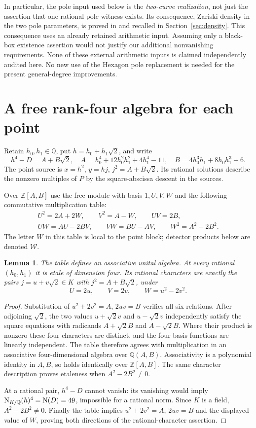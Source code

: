 \documentclass[11pt,a4paper]{article}
\newtheorem{lemma}[theorem]{Lemma}
\theoremstyle{remark}\newtheorem{remark}[theorem]{Remark}
\newcommand{\Q}{\mathbb Q}\newcommand{\Z}{\mathbb Z}\newcommand{\C}{\mathbb C}
\begin{document}
In particular, the pole input used below is the \emph{two-curve
realization}, not just the assertion that one rational pole witness
exists. Its consequence, Zariski density in the two pole parameters,
is proved in \cite{Density} and recalled in Section~\ref{sec:density}.
This consequence uses an already retained arithmetic input. Assuming
only a black-box existence assertion would not justify our additional
nonvanishing requirements. None of these external arithmetic inputs is
claimed independently audited here. No new use of the Hexagon pole
replacement is needed for the present general-degree improvements.

\section{A free rank-four algebra for each point}\label{sec:points}
Retain $h_0,h_1\in\Q$, put $h=h_0+h_1\sqrt2$, and write
\[
 h^4-D=A+B\sqrt2,
\quad A=h_0^4+12h_0^2h_1^2+4h_1^4-11,
\quad B=4h_0^3h_1+8h_0h_1^3+6.
\]
The point source is $x=h^2$, $y=hj$, $j^2=A+B\sqrt2$.
Its rational solutions describe the nonzero multiples of $P$ by the
square-abscissa descent in the sources.

Over $\Z[A,B]$ use the free module with basis $1,U,V,W$ and the
following commutative multiplication table:
\begin{equation}\label{eq:table}
\begin{gathered}
 U^2=2A+2W,\qquad V^2=A-W,\qquad UV=2B,\\
 UW=AU-2BV,\qquad VW=BU-AV,\qquad W^2=A^2-2B^2.
\end{gathered}
\end{equation}
The letter $W$ in this table is local to the point block; detector
products below are denoted $\mathcal W$.

\begin{lemma}\label{lem:block}
The table defines an associative unital algebra. At every rational
$(h_0,h_1)$ it is etale of dimension four. Its rational characters
are exactly the pairs $j=u+v\sqrt2\in K$ with $j^2=A+B\sqrt2$,
under
\[
 U=2u,\qquad V=2v,\qquad W=u^2-2v^2.
\]
\end{lemma}
\begin{proof}
Substitution of $u^2+2v^2=A$, $2uv=B$ verifies all six relations.
After adjoining $\sqrt2$, the two values $u+\sqrt2v$ and
$u-\sqrt2v$ independently satisfy the square equations with radicands
$A+\sqrt2B$ and $A-\sqrt2B$. Where their product is nonzero these
four characters are distinct, and the four basis functions are
linearly independent. The table therefore agrees with multiplication
in an associative four-dimensional algebra over $\Q(A,B)$.
Associativity is a polynomial identity in $A,B$, so holds identically
over $\Z[A,B]$. The same character description proves etaleness when
$A^2-2B^2\ne0$.

At a rational pair, $h^4-D$ cannot vanish: its vanishing would imply
$\N_{K/\Q}(h)^4=\N(D)=49$, impossible for a rational norm. Since
$K$ is a field, $A^2-2B^2\ne0$. Finally the table implies
$u^2+2v^2=A$, $2uv=B$ and the displayed value of $W$, proving both
directions of the rational-character assertion.
\end{proof}
\end{document}
